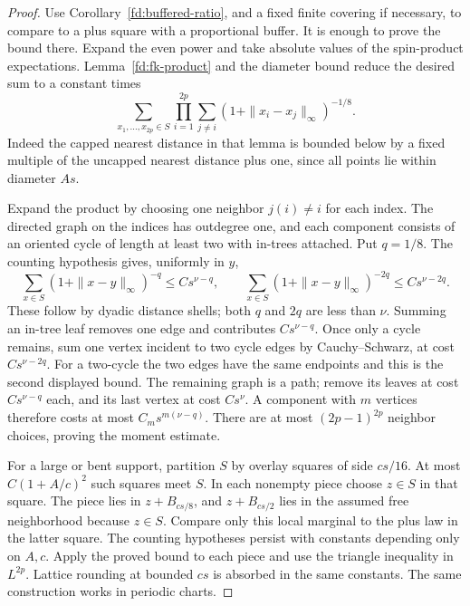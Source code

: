 \begin{proof}
Use Corollary~\ref{fd:buffered-ratio}, and a fixed finite covering if
necessary, to compare to a plus square with a proportional buffer.
It is enough to prove the bound there.  Expand the even power and take
absolute values of the spin-product expectations.  Lemma~\ref{fd:fk-product}
and the diameter bound reduce the desired sum to a constant times
\[
 \sum_{x_1,\ldots,x_{2p}\in S}
 \prod_{i=1}^{2p}
       \sum_{j\ne i}(1+\|x_i-x_j\|_\infty)^{-1/8}.
\]
Indeed the capped nearest distance in that lemma is bounded below by
a fixed multiple of the uncapped nearest distance plus one, since all
points lie within diameter \(As\).

Expand the product by choosing one neighbor \(j(i)\ne i\) for each
index.  The directed graph on the indices has outdegree one, and each
component consists of an oriented cycle of length at least two with
in-trees attached.  Put \(q=1/8\).  The counting hypothesis gives, uniformly
in \(y\),
\[
 \sum_{x\in S}(1+\|x-y\|_\infty)^{-q}
       \le C s^{\nu-q},
 \qquad
 \sum_{x\in S}(1+\|x-y\|_\infty)^{-2q}
       \le C s^{\nu-2q}.
\]
These follow by dyadic distance shells; both \(q\) and \(2q\) are less
than \(\nu\).  Summing an in-tree leaf removes one edge and contributes
\(Cs^{\nu-q}\).  Once only a cycle remains, sum one vertex incident to
two cycle edges by Cauchy--Schwarz, at cost \(Cs^{\nu-2q}\).
For a two-cycle the two edges have the same endpoints and this is the
second displayed bound.  The remaining graph is a path; remove its leaves
at cost \(Cs^{\nu-q}\) each, and its last vertex at cost \(Cs^\nu\).
A component with \(m\) vertices therefore costs at most
\(C_m s^{m(\nu-q)}\).  There are at most \((2p-1)^{2p}\) neighbor
choices, proving the moment estimate.

For a large or bent support, partition \(S\) by overlay squares of
side \(cs/16\).  At most \(C(1+A/c)^2\) such squares meet
\(S\).  In each nonempty piece choose \(z\in S\) in that square.
The piece lies in \(z+B_{cs/8}\), and \(z+B_{cs/2}\) lies in the
assumed free neighborhood because \(z\in S\).  Compare only this
local marginal to the plus law in the latter square.  The counting
hypotheses persist with constants depending only on \(A,c\).  Apply
the proved bound to each piece and use the triangle inequality in
\(L^{2p}\).  Lattice rounding at bounded \(cs\) is absorbed in the
same constants.  The same construction works in periodic charts.
\end{proof}
